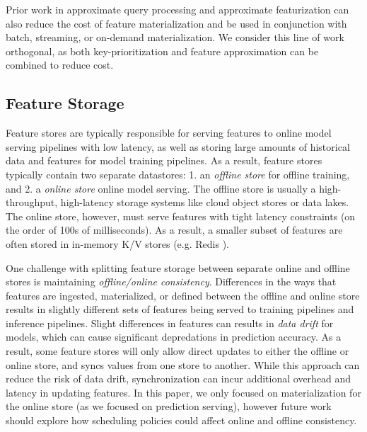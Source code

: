 Prior work in approximate query processing and approximate featurization \cite{willump} can also reduce the cost of feature materialization and be used in conjunction with batch, streaming, or on-demand materialization. We consider this line of work orthogonal, as both key-prioritization and feature approximation can be combined to reduce cost.  




\subsection{Feature Storage}
Feature stores are typically responsible for serving features to online model serving pipelines with low latency, as well as storing large amounts of historical data and features for model training pipelines. As a result, feature stores typically contain two separate datastores: 1. an \textit{offline store} for offline training, and 2. a \textit{online store} online model serving. The offline store is usually a high-throughput, high-latency storage systems like cloud object stores or data lakes. The online store, however, must serve features with tight latency constraints (on the order of 100s of milliseconds). As a result, a smaller subset of features are often stored in in-memory K/V stores (e.g. Redis \cite{redis}).

One challenge with splitting feature storage between separate online and offline stores is maintaining \textit{offline/online consistency}. Differences in the ways that features are ingested, materialized, or defined between the offline and online store results in slightly different sets of features being served to training pipelines and inference pipelines. Slight differences in features can results in \textit{data drift} for models, which can cause significant depredations in prediction accuracy. As a result, some feature stores will only allow direct updates to either the offline or online store, and syncs values from one store to another. While this approach can reduce the risk of data drift, synchronization can incur additional overhead and latency in updating features. In this paper, we only focused on materialization for the online store (as we focused on prediction serving), however future work should explore how scheduling policies could affect online and offline consistency. 


